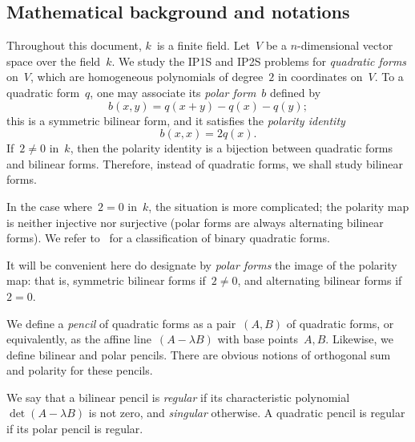 \documentclass{lms}
\begin{document}
\subsection*{Mathematical background and notations}
Throughout this document, $k$~is a finite field.
Let~$V$ be a $n$-dimensional vector space over the field~$k$.
We study the IP1S and IP2S problems for \emph{quadratic forms} on~$V$,
which are homogeneous polynomials of degree~$2$ in coordinates on~$V$.
To a quadratic form~$q$,
one may associate its \emph{polar form}~$b$ defined by
\begin{equation*}\label{eq:polar}
b(x,y) = q(x+y) - q(x) - q(y);
\end{equation*}
this is a symmetric bilinear form,
and it satisfies the \emph{polarity identity}
\begin{equation*}\label{eq:polarity}
b(x,x) = 2q(x).
\end{equation*}
If~$2 ≠ 0$ in~$k$, then the polarity identity is a bijection between
quadratic forms and bilinear forms.
Therefore, instead of quadratic forms, we shall study bilinear forms.

In the case where~$2 = 0$ in~$k$, the situation is more complicated;
the polarity map is neither injective nor surjective
(polar forms are always alternating bilinear forms).
We refer to~\cite{milnorhusemoller} for a classification of
binary quadratic forms.

It will be convenient here do designate by \emph{polar forms}
the image of the polarity map: that is, symmetric bilinear forms if~$2 ≠ 0$,
and alternating bilinear forms if~$2 = 0$.

\medbreak
We define a \emph{pencil} of quadratic forms
as a pair~$(A, B)$ of quadratic forms,
or equivalently, as the affine line~$(A - λ B)$ with base points~$Α, B$.
Likewise, we define bilinear and polar pencils.
There are obvious notions of orthogonal sum and polarity for these pencils.

We say that a bilinear pencil is \emph{regular}
if its characteristic polynomial~$\det (A - λ B)$ is not zero,
and \emph{singular} otherwise.
A quadratic pencil is regular if its polar pencil is regular.
\end{document}
